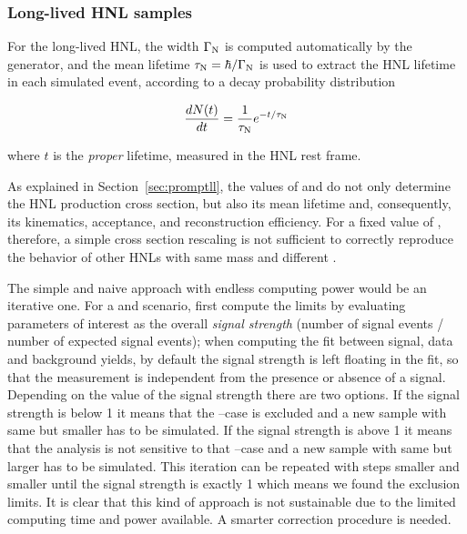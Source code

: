\subsubsection{Long-lived HNL samples}\label{sec:reweighting}
For the long-lived HNL, the width $\Gamma_{\mathrm{N}}$ is computed automatically by the
generator, and the mean lifetime $\tau_{\mathrm{N}} = \hbar/\Gamma_{\mathrm{N}}$
is used to extract the HNL lifetime in each simulated event,
according to a decay probability distribution
\begin{linenomath}
  \begin{equation}
\frac{dN(t)}{dt} = \frac{1}{\tau_{\mathrm{N}}}e^{-t/\tau_{\mathrm{N}}}
  \end{equation}
  \label{eq:dndt}
\end{linenomath}
where $t$ is the
\emph{proper} lifetime, measured in the HNL rest frame.

As explained in Section~\ref{sec:promptll}, the values of \mhnl
and \mixpar do not only determine the HNL production cross section,
but also its mean lifetime and, consequently, its kinematics,
acceptance, and reconstruction efficiency.
For a fixed value of \mhnl, therefore, a simple cross section
rescaling is not sufficient to correctly reproduce the behavior of
other HNLs with same mass and different \mixpar.

The simple and naive approach with endless computing power would be an
iterative one. For a \mhnl
and \mixpar scenario, first compute the limits by evaluating parameters
of interest as the overall \emph{signal strength} (number of signal events /
number of expected signal events); when computing the fit between
signal, data and background yields, by default the signal strength is
left floating in the fit, so that the measurement is independent from the
presence or absence of a signal. Depending on the value of the signal
strength there are two options. If the signal strength is below 1 it
means that the \mhnl --\mixpar case is excluded and a new sample with
same \mhnl but smaller \mixpar has to be simulated. If the signal strength is above 1 it
means that the analysis is not sensitive to that \mhnl --\mixpar case and a new sample with
same \mhnl but larger \mixpar has to be simulated. This iteration can
be repeated with steps smaller and smaller until the signal strength is
exactly 1 which means we found the exclusion limits. It is clear that
this kind of approach is not sustainable due to the limited computing
time and power available. A smarter correction procedure is needed.

